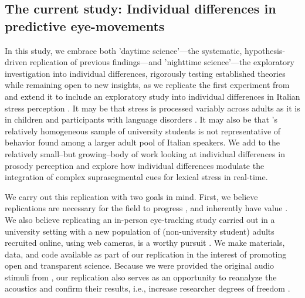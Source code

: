 \subsection{The current study: Individual differences in predictive eye-movements}
In this study, we embrace both 'daytime science'—the systematic, hypothesis-driven replication of previous findings—and 'nighttime science'—the exploratory investigation into individual differences, rigorously testing established theories while remaining open to new insights, as we replicate the first experiment from \cite{Sulpizio_McQueen_2012} and extend it to include an exploratory study into individual differences in Italian stress perception \citep{Yanai2020}. It may be that stress is processed variably across adults as it is in children \citep[e.g.,][]{Colombo2014} and participants with language disorders \citep[e.g.,][]{Cappa1997, Liu2018}. It may also be that \cite{Sulpizio_McQueen_2012}'s relatively homogeneous sample of university students is not representative of behavior found among a larger adult pool of Italian speakers. We add to the relatively small--but growing--body of work looking at individual differences in prosody perception \citep[e.g.,][]{Roy2017, Bishop2017, Lameris2023, Sinagra2022} and explore how individual differences modulate the integration of complex suprasegmental cues for lexical stress in real-time.

We carry out this replication with two goals in mind. First, we believe replications are necessary for the field to progress \citep{Rakosi2017}, and inherently have value \citep{Kobrock2023}. We also believe replicating an in-person eye-tracking study carried out in a university setting with a new population of (non-university student) adults recruited online, using web cameras, is a worthy pursuit \citep{Prystauka_Altmann_Rothman_2023}. We make materials, data, and code available as part of our replication in the interest of promoting open and transparent science. Because we were provided the original audio stimuli from \cite{Sulpizio_McQueen_2012}, our replication also serves as an opportunity to reanalyze the acoustics and confirm their results, i.e., increase researcher degrees of freedom \cite{Corretta2023}.

